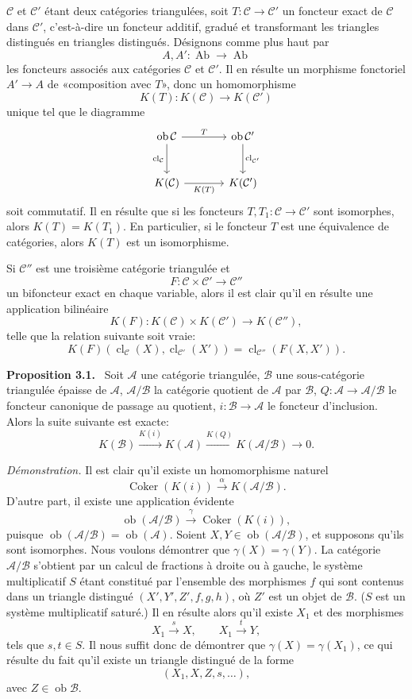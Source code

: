 \documentclass[11pt]{article}
\newenvironment{statement}[1]{\par\medskip\noindent\textbf{#1.}\ }{\par\medskip}
\providecommand{\Ob}{\operatorname{ob}}
\providecommand{\cC}{\mathcal C}
\providecommand{\Ob}{\operatorname{ob}}
\providecommand{\Ab}{\operatorname{Ab}}
\providecommand{\cC}{\mathcal C}
\providecommand{\cA}{\mathcal A}
\providecommand{\cB}{\mathcal B}
\providecommand{\Ab}{\operatorname{Ab}}
\providecommand{\Ob}{\operatorname{Ob}}
\begin{document}
$\cC$ et $\cC'$ étant deux catégories triangulées, soit $T:\cC\to\cC'$ un foncteur exact de $\cC$ dans $\cC'$, c'est-à-dire un foncteur additif, gradué et transformant les triangles distingués en triangles distingués. Désignons comme plus haut par
\[
A,A':\Ab\longrightarrow\Ab
\]
les foncteurs associés aux catégories $\cC$ et $\cC'$. Il en résulte un morphisme fonctoriel $A'\to A$ de «composition avec $T$», donc un homomorphisme
\[
K(T):K(\cC)\longrightarrow K(\cC')
\]
unique tel que le diagramme
\[
\begin{tikzcd}[column sep=large,row sep=large]
\Ob\cC \arrow[r,"T"] \arrow[d,"\operatorname{cl}_{\cC}"']&
\Ob\cC' \arrow[d,"\operatorname{cl}_{\cC'}"]\\
K(\cC) \arrow[r,"K(T)"']& K(\cC')
\end{tikzcd}
\]
soit commutatif. Il en résulte que si les foncteurs $T,T_1:\cC\to\cC'$ sont isomorphes, alors $K(T)=K(T_1)$. En particulier, si le foncteur $T$ est une équivalence de catégories, alors $K(T)$ est un isomorphisme.

Si $\cC''$ est une troisième catégorie triangulée et
\[
F:\cC\times\cC'\longrightarrow \cC''
\]
un bifoncteur exact en chaque variable, alors il est clair qu'il en résulte une application bilinéaire
\[
K(F):K(\cC)\times K(\cC')\longrightarrow K(\cC''),
\]
telle que la relation suivante soit vraie:
\[
K(F)(\operatorname{cl}_{\cC}(X),\operatorname{cl}_{\cC'}(X'))
=
\operatorname{cl}_{\cC''}(F(X,X')).
\]

\begin{statement}{Proposition 3.1}
Soit $\cA$ une catégorie triangulée, $\cB$ une sous-catégorie triangulée épaisse de $\cA$, $\cA/\cB$ la catégorie quotient de $\cA$ par $\cB$, $Q:\cA\to\cA/\cB$ le foncteur canonique de passage au quotient, $i:\cB\to\cA$ le foncteur d'inclusion. Alors la suite suivante est exacte:
\[
K(\cB)\xrightarrow{K(i)}K(\cA)\xrightarrow{K(Q)}K(\cA/\cB)\longrightarrow 0.
\]
\end{statement}

\emph{Démonstration.} Il est clair qu'il existe un homomorphisme naturel
\[
\operatorname{Coker}(K(i))\xrightarrow{\alpha}K(\cA/\cB).
\]
D'autre part, il existe une application évidente
\[
\Ob(\cA/\cB)\xrightarrow{\gamma}\operatorname{Coker}(K(i)),
\]
puisque $\Ob(\cA/\cB)=\Ob(\cA)$. Soient $X,Y\in\Ob(\cA/\cB)$, et supposons qu'ils sont isomorphes. Nous voulons démontrer que $\gamma(X)=\gamma(Y)$. La catégorie $\cA/\cB$ s'obtient par un calcul de fractions à droite ou à gauche, le système multiplicatif $S$ étant constitué par l'ensemble des morphismes $f$ qui sont contenus dans un triangle distingué $(X',Y',Z',f,g,h)$, où $Z'$ est un objet de $\cB$. ($S$ est un système multiplicatif saturé.) Il en résulte alors qu'il existe $X_1$ et des morphismes
\[
X_1\xrightarrow{s}X,\qquad X_1\xrightarrow{t}Y,
\]
tels que $s,t\in S$. Il nous suffit donc de démontrer que $\gamma(X)=\gamma(X_1)$, ce qui résulte du fait qu'il existe un triangle distingué de la forme
\[
(X_1,X,Z,s,\ldots),
\]
avec $Z\in\Ob\cB$.
\end{document}
